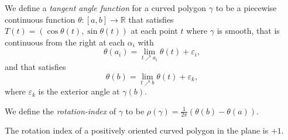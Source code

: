 \begin{definition}
  \label{definition-curved-polygon-tangent-angle-function}
  \label{definition-curved-polygon-rotation-index}
  We define a \emph{tangent angle function} for a curved polygon \( \gamma \) to be a piecewise continuous function \( \theta: [a, b] \to \mathbb{R} \) that satisfies \( T(t) = (\cos \theta(t), \sin \theta(t)) \) at each point \( t \) where \( \gamma \) is smooth, that is continuous from the right at each \( \alpha_i \) with
  \[
    \theta(a_i) = \lim\limits_{t \nearrow a_i} \theta(t) + \varepsilon_i,
  \]
  and that satisfies
  \[
    \theta(b) = \lim\limits_{t \nearrow b} \theta(t) + \varepsilon_k,
  \]
  where \( \varepsilon_k \) is the exterior angle at \( \gamma(b) \).

  We define the \emph{rotation-index} of \( \gamma \) to be \( \rho(\gamma) = \frac{1}{2 \pi} (\theta(b) - \theta(a)) \).
\end{definition}

\begin{theorem}
  \label{theorem-curved-polygon-rotation-index}
  The rotation index of a positively oriented curved polygon in the plane is \( +1 \).
\end{theorem}

